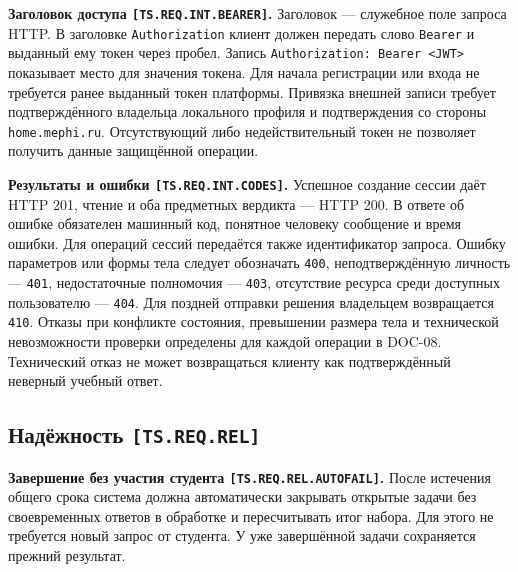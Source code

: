 \documentclass[12pt,a4paper]{article}
\begin{document}
\hypertarget{ts-req-int-bearer}{} \textbf{Заголовок доступа \texttt{[TS.\allowbreak{}REQ.\allowbreak{}INT.\allowbreak{}BEARER]}.} Заголовок --- служебное поле запроса HTTP. В заголовке \texttt{Authorization} клиент должен передать слово \texttt{Bearer} и выданный ему токен через пробел. Запись \texttt{Authorization:\ Bearer\ \textless{}JWT\textgreater{}} показывает место для значения токена. Для начала регистрации или входа не требуется ранее выданный токен платформы. Привязка внешней записи требует подтверждённого владельца локального профиля и подтверждения со стороны \texttt{home.\allowbreak{}mephi.\allowbreak{}ru}. Отсутствующий либо недействительный токен не позволяет получить данные защищённой операции.

\hypertarget{ts-req-int-codes}{} \textbf{Результаты и ошибки \texttt{[TS.\allowbreak{}REQ.\allowbreak{}INT.\allowbreak{}CODES]}.} Успешное создание сессии даёт HTTP 201, чтение и оба предметных вердикта --- HTTP 200. В ответе об ошибке обязателен машинный код, понятное человеку сообщение и время ошибки. Для операций сессий передаётся также идентификатор запроса. Ошибку параметров или формы тела следует обозначать \texttt{400}, неподтверждённую личность --- \texttt{401}, недостаточные полномочия --- \texttt{403}, отсутствие ресурса среди доступных пользователю --- \texttt{404}. Для поздней отправки решения владельцем возвращается \texttt{410}. Отказы при конфликте состояния, превышении размера тела и технической невозможности проверки определены для каждой операции в DOC-08. Технический отказ не может возвращаться клиенту как подтверждённый неверный учебный ответ.

\subsection{\texorpdfstring{Надёжность \texttt{[TS.\allowbreak{}REQ.\allowbreak{}REL]}}{Надёжность }}\label{33-ux43dux430ux434ux451ux436ux43dux43eux441ux442ux44c-tsreqrel}

\hypertarget{33-надёжность-tsreqrel}{}

\hypertarget{ts-req-rel}{}

\hypertarget{ts-req-rel-autofail}{} \textbf{Завершение без участия студента \texttt{[TS.\allowbreak{}REQ.\allowbreak{}REL.\allowbreak{}AUTOFAIL]}.} После истечения общего срока система должна автоматически закрывать открытые задачи без своевременных ответов в обработке и пересчитывать итог набора. Для этого не требуется новый запрос от студента. У уже завершённой задачи сохраняется прежний результат.
\end{document}
